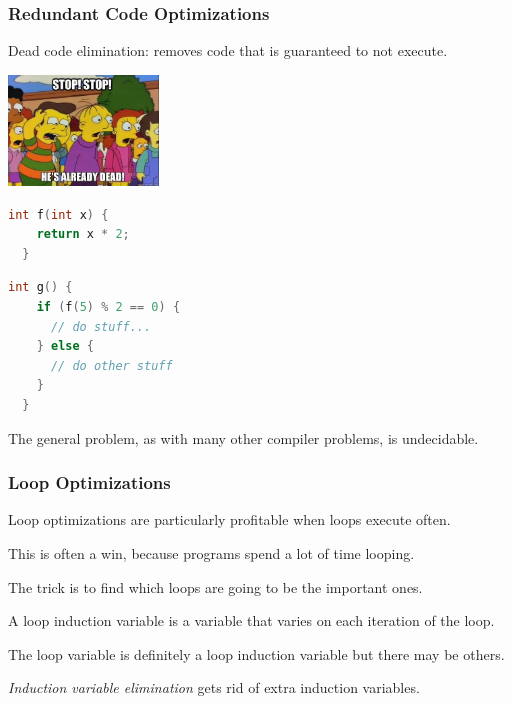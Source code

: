 \begin{frame}[fragile]
\frametitle{Redundant Code Optimizations}

Dead code elimination: removes code that is guaranteed to not execute.

\begin{center}
	\includegraphics[width=0.3\textwidth]{images/alreadydead.jpg}
\end{center}

\begin{center}
\vspace*{-2em}
\begin{minipage}{.3\textwidth}
\begin{lstlisting}[language=C]
  int f(int x) {
    return x * 2;
  }
  \end{lstlisting}
  \end{minipage} \begin{minipage}{.3\textwidth}
\begin{lstlisting}[language=C]
  int g() {
    if (f(5) % 2 == 0) {
      // do stuff...
    } else {
      // do other stuff
    }
  }
\end{lstlisting}
\end{minipage}
\end{center}

The general problem, as with many other compiler problems, is undecidable.


\end{frame}


\begin{frame}
\frametitle{Loop Optimizations}

Loop optimizations are particularly profitable when loops execute
often. 

This is often a win, because programs spend a lot of time looping.


The trick is to find which loops are going to be the important ones.

A loop induction variable is a variable that varies on each iteration
of the loop. 

The loop variable is definitely a loop induction variable
but there may be others. 

\emph{Induction variable elimination} gets
rid of extra induction variables.



\end{frame}

